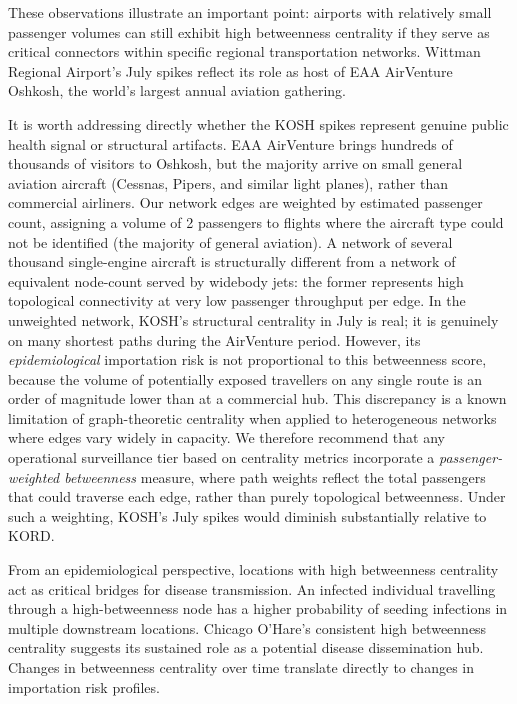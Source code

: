 \documentclass{elsarticle}
\begin{document}
These observations illustrate an important point: airports with relatively small passenger volumes can still exhibit high betweenness centrality if they serve as critical connectors within specific regional transportation networks. Wittman Regional Airport's July spikes reflect its role as host of EAA AirVenture Oshkosh, the world's largest annual aviation gathering.

It is worth addressing directly whether the KOSH spikes represent genuine public health signal or structural artifacts. EAA AirVenture brings hundreds of thousands of visitors to Oshkosh, but the majority arrive on small general aviation aircraft (Cessnas, Pipers, and similar light planes), rather than commercial airliners. Our network edges are weighted by estimated passenger count, assigning a volume of 2 passengers to flights where the aircraft type could not be identified (the majority of general aviation). A network of several thousand single-engine aircraft is structurally different from a network of equivalent node-count served by widebody jets: the former represents high topological connectivity at very low passenger throughput per edge. In the unweighted network, KOSH's structural centrality in July is real; it is genuinely on many shortest paths during the AirVenture period. However, its \textit{epidemiological} importation risk is not proportional to this betweenness score, because the volume of potentially exposed travellers on any single route is an order of magnitude lower than at a commercial hub. This discrepancy is a known limitation of graph-theoretic centrality when applied to heterogeneous networks where edges vary widely in capacity. We therefore recommend that any operational surveillance tier based on centrality metrics incorporate a \textit{passenger-weighted betweenness} measure, where path weights reflect the total passengers that could traverse each edge, rather than purely topological betweenness. Under such a weighting, KOSH's July spikes would diminish substantially relative to KORD. 

From an epidemiological perspective, locations with high betweenness centrality act as critical bridges for disease transmission. An infected individual travelling through a high-betweenness node has a higher probability of seeding infections in multiple downstream locations. Chicago O'Hare's consistent high betweenness centrality suggests its sustained role as a potential disease dissemination hub. Changes in betweenness centrality over time translate directly to changes in importation risk profiles.
\end{document}
